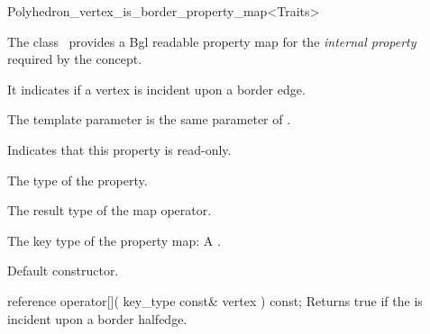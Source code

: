 

\begin{ccRefClass}{Polyhedron_vertex_is_border_property_map<Traits>}


\ccDefinition

The class \ccRefName\ provides a {\sc Bgl}
{readable property map} 
for the {\em internal property} 
required by the  concept.

It indicates if a  vertex is incident upon a border edge.

The template parameter  is the same  parameter of 
.



\ccTypes
    {Indicates that this property is read-only.}
  
    {The type of the property.}
    
    {The result type of the map operator.}
    
  {The key type of the property map: A .}

\ccCreation
{}  %

{Default constructor.}

\ccOperations

\ccMethod
  {reference operator[]( key_type const& vertex ) const;}
  {Returns true if the  is incident upon a border halfedge.}  
    
\ccIsModel
{} 

\end{ccRefClass}


